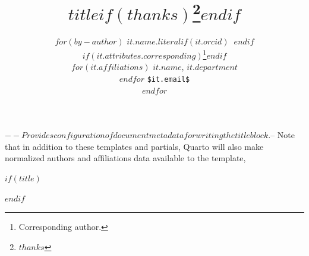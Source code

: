 $-- Provides configuration of document metadata for writing the title block.
$-- Note that in addition to these templates and partials, Quarto will also make normalized authors and affiliations data available to the template,

$if(title)$
\title{$title$$if(thanks)$\thanks{$thanks$}$endif$}
$endif$

\author{
$for(by-author)$
{\bfseries \normalsize $it.name.literal$$if(it.orcid)$~$endif$}%
$if(it.attributes.corresponding)$\thanks{Corresponding author.}$endif$ \\%
$for(it.affiliations)$ \small $it.name$, $it.department$ \\$endfor$%
{\footnotesize \nolinkurl{$it.email$}} \\\vspace{10pt}
$endfor$
}

\predate{}
\postdate{}
\date{}
